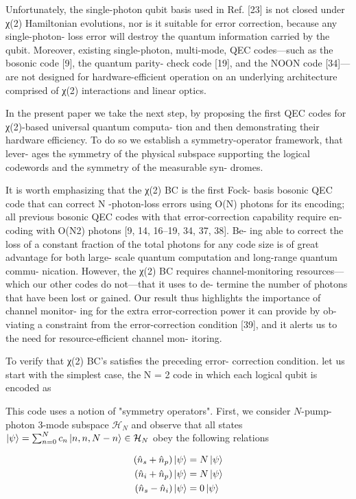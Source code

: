 \documentclass[12]{amsart}
\newcommand\0{\mathbf{0}}
\newcommand\<{\langle}
\renewcommand\>{\rangle}
\begin{document}
Unfortunately, the single-photon qubit basis used in Ref. [23] is not closed under χ(2) Hamiltonian evolutions, nor is it suitable for error correction, because any single-photon- loss error will destroy the quantum information carried by the qubit. Moreover, existing single-photon, multi-mode, QEC codes—such as the bosonic code [9], the quantum parity- check code [19], and the NOON code [34]—are not designed for hardware-efficient operation on an underlying architecture comprised of χ(2) interactions and linear optics.

In the present paper we take the next step, by proposing the first QEC codes for χ(2)-based universal quantum computa- tion and then demonstrating their hardware efficiency. To do so we establish a symmetry-operator framework, that lever- ages the symmetry of the physical subspace supporting the logical codewords and the symmetry of the measurable syn- dromes.


It is worth emphasizing that the χ(2) BC is the first Fock- basis bosonic QEC code that can correct N -photon-loss errors using O(N) photons for its encoding; all previous bosonic QEC codes with that error-correction capability require en- coding with O(N2) photons [9, 14, 16–19, 34, 37, 38]. Be- ing able to correct the loss of a constant fraction of the total photons for any code size is of great advantage for both large- scale quantum computation and long-range quantum commu- nication. However, the χ(2) BC requires channel-monitoring resources—which our other codes do not—that it uses to de- termine the number of photons that have been lost or gained. Our result thus highlights the importance of channel monitor- ing for the extra error-correction power it can provide by ob- viating a constraint from the error-correction condition [39], and it alerts us to the need for resource-efficient channel mon- itoring.

To verify that χ(2) BC’s satisfies the preceding error- correction condition. let us start with the simplest case, the N = 2 code in which each logical qubit is encoded as


This code uses a notion of "symmetry operators". First, we consider $N$-pump-photon 3-mode subspace $\mathcal{H}_N$ and observe that all states $\ket{\psi} = \sum_{n=0}^N c_n \ket{n, n, N-n} \in \mathcal{H}_N$ obey the following relations

\begin{align}
\begin{split}
	(\hat{n}_s + \hat{n}_p) \ket{\psi} &= N\ket{\psi} \\
	(\hat{n}_i + \hat{n}_p) \ket{\psi} &= N\ket{\psi} \\
	(\hat{n}_s - \hat{n}_i) \ket{\psi} &= 0\ket{\psi}
\end{split}
\end{align}
\end{document}
